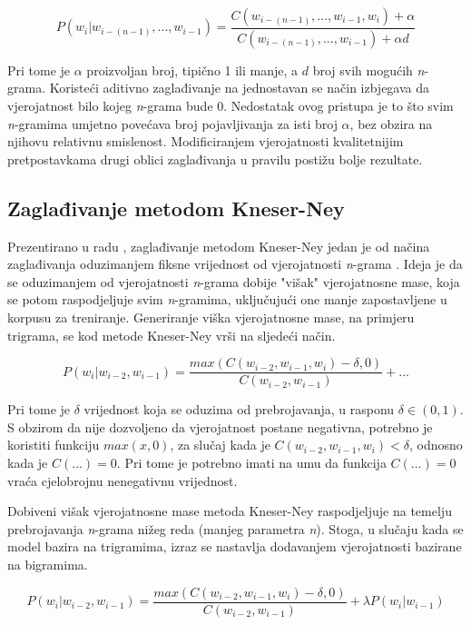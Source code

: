 \documentclass[times, utf8, diplomski, numeric]{fer}
\begin{document}
\[
P(w_i | w_{i - (n - 1)}, ... , w_{i - 1}) = \frac{C(w_{i - (n - 1)}, ... , w_{i - 1}, w_i) + \alpha}{C(w_{i - (n - 1)}, ... , w_{i - 1}) + \alpha d}
\]

Pri tome je $\alpha$ proizvoljan broj, tipično 1 ili manje, a $d$ broj svih mogućih \textit{n}-grama. Koristeći aditivno zaglađivanje na jednostavan se način izbjegava da vjerojatnost bilo kojeg \textit{n}-grama bude 0. Nedostatak ovog pristupa je to što svim \textit{n}-gramima umjetno povećava broj pojavljivanja za isti broj $\alpha$, bez obzira na njihovu relativnu smislenost. Modificiranjem vjerojatnosti kvalitetnijim pretpostavkama drugi oblici zaglađivanja u pravilu postižu bolje rezultate.

\subsection{Zaglađivanje metodom Kneser-Ney}

Prezentirano u radu \cite{Kneser1995}, zaglađivanje metodom Kneser-Ney jedan je od načina zaglađivanja oduzimanjem fiksne vrijednost od vjerojatnosti \textit{n}-grama . Ideja je da se oduzimanjem od vjerojatnosti \textit{n}-grama dobije "višak" vjerojatnosne mase, koja se potom raspodjeljuje svim \textit{n}-gramima, uključujući one manje zapostavljene u korpusu za treniranje. Generiranje viška vjerojatnosne mase, na primjeru trigrama, se kod metode Kneser-Ney vrši na sljedeći način.

\[
P(w_i | w_{i - 2}, w_{i - 1}) =
  \frac{max\left(C(w_{i - 2}, w_{i - 1}, w_i) - \delta, 0\right)}
    {C(w_{i - 2}, w_{i - 1})} + ...
\]

Pri tome je $\delta$ vrijednost koja se oduzima od prebrojavanja, u rasponu $\delta \in (0, 1)$. S obzirom da nije dozvoljeno da vjerojatnost postane negativna, potrebno je koristiti funkciju $max(x, 0)$, za slučaj kada je $C(w_{i - 2}, w_{i - 1}, w_i) < \delta$, odnosno kada je $C(...) = 0$. Pri tome je potrebno imati na umu da funkcija $C(...) = 0$ vraća cjelobrojnu nenegativnu vrijednost. 

Dobiveni višak vjerojatnosne mase metoda Kneser-Ney raspodjeljuje na temelju prebrojavanja \textit{n}-grama nižeg reda (manjeg parametra \textit{n}). Stoga, u slučaju kada se model bazira na trigramima, izraz se nastavlja dodavanjem vjerojatnosti bazirane na bigramima.

\[
P(w_i | w_{i - 2}, w_{i - 1}) =
  \frac{max\left(C(w_{i - 2}, w_{i - 1}, w_i) - \delta, 0\right)}
    {C(w_{i - 2}, w_{i - 1})} + \lambda P(w_i | w_{i - 1})
\]
\end{document}
